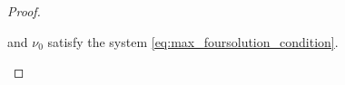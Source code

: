 \documentclass{article}
\newcommand{\0}{\textbf{0}}
\newcommand{\1}{\textbf{1}}
\newcommand{\TRACE}{\operatorname{Tr}_1^k}
\theoremstyle{plain}
\begin{document}
\begin{proof}
\begin{enumerate}[label=\textbf{Case \arabic*},wide = 0pt]
    and $ \nu_0 $ satisfy the system \eqref{eq:max_foursolution_condition}. 

    \end{enumerate}
    \end{proof}
        
    

\end{document}
